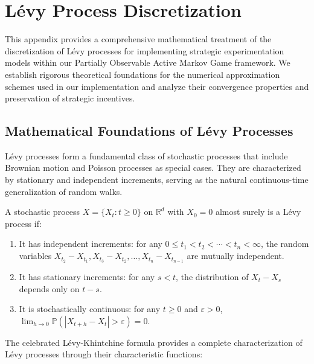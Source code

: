 \section{Lévy Process Discretization}
\label{appendix:levy_discretization}

This appendix provides a comprehensive mathematical treatment of the discretization of Lévy processes for implementing strategic experimentation models within our Partially Observable Active Markov Game framework. We establish rigorous theoretical foundations for the numerical approximation schemes used in our implementation and analyze their convergence properties and preservation of strategic incentives.

\subsection{Mathematical Foundations of Lévy Processes}
\label{appendix:levy_foundations}

Lévy processes form a fundamental class of stochastic processes that include Brownian motion and Poisson processes as special cases. They are characterized by stationary and independent increments, serving as the natural continuous-time generalization of random walks.

\begin{definition}
    A stochastic process $X = \{X_t : t \geq 0\}$ on $\mathbb{R}^d$ with $X_0 = 0$ almost surely is a Lévy process if:
    \begin{enumerate}
        \item It has independent increments: for any $0 \leq t_1 < t_2 < \cdots < t_n < \infty$, the random variables $X_{t_2} - X_{t_1}, X_{t_3} - X_{t_2}, \ldots, X_{t_n} - X_{t_{n-1}}$ are mutually independent.
        \item It has stationary increments: for any $s < t$, the distribution of $X_t - X_s$ depends only on $t-s$.
        \item It is stochastically continuous: for any $t \geq 0$ and $\varepsilon > 0$, $\lim_{h \to 0} \mathbb{P}(|X_{t+h} - X_t| > \varepsilon) = 0$.
    \end{enumerate}
\end{definition}

The celebrated Lévy-Khintchine formula provides a complete characterization of Lévy processes through their characteristic functions:


